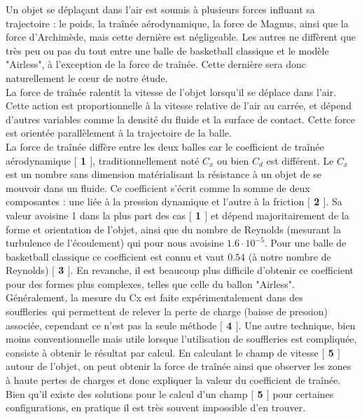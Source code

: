 \documentclass{article}
\newcommand{\mvtab} {\vspace{0.1cm}}
\newcommand{\htab} {\hspace{1cm}}
\begin{document}
\htab Un objet se déplaçant dans l'air est soumis à plusieurs forces influant sa trajectoire : le poids, la traînée aérodynamique, la force de Magnus, ainsi que la force d'Archimède, mais cette dernière est négligeable. Les autres ne diffèrent que très peu ou pas du tout entre une balle de basketball classique et le modèle "Airless", à l'exception de la force de traînée. Cette dernière sera donc naturellement le cœur de notre étude. \\ \mvtab
\htab La force de traînée ralentit la vitesse de l'objet lorsqu'il se déplace dans l'air. Cette action est proportionnelle à la vitesse relative de l'air au carrée, et dépend d'autres variables comme la densité du fluide et la surface de contact. Cette force est orientée parallèlement à la trajectoire de la balle. \\  \mvtab
\htab La force de traînée diffère entre les deux balles car le coefficient de traînée aérodynamique \textbf{$[$ 1 $]$}, traditionnellement noté $C_x$ ou bien $C_d$ est différent. Le $C_x$ est un nombre sans dimension matérialisant la résistance à un objet de se mouvoir dans un fluide. Ce coefficient s'écrit comme la somme de deux composantes : une liée à la pression dynamique et l'autre à la friction \textbf{$[$ 2 $]$}. Sa valeur avoisine 1 dans la plus part des cas \textbf{$[$ 1 $]$} et dépend majoritairement de la forme et orientation de l'objet, ainsi que du nombre de Reynolds (mesurant la turbulence de l’écoulement) qui pour nous avoisine $1.6 \cdot 10^{-5}$. Pour une balle de basketball classique ce coefficient est connu et vaut $0.54$ (à notre nombre de Reynolds) \textbf{$[$ 3 $]$}. En revanche, il est beaucoup plus difficile d’obtenir ce coefficient pour des formes plus complexes, telles que celle du ballon "Airless". \\ \mvtab
\htab Généralement, la mesure du Cx est faite expérimentalement dans des souffleries qui permettent de relever la perte de charge (baisse de pression) associée, cependant ce n’est pas la seule méthode \textbf{$[$ 4 $]$}. Une autre technique, bien moins conventionnelle mais utile lorsque l'utilisation de souffleries est compliquée, consiste à obtenir le résultat par calcul. En calculant le champ de vitesse \textbf{$[$ 5 $]$} autour de l’objet, on peut obtenir la force de traînée ainsi que observer les zones à haute pertes de charges et donc expliquer la valeur du coefficient de traînée. Bien qu'il existe des solutions pour le calcul d'un champ \textbf{$[$ 5 $]$} pour certaines configurations, en pratique il est très souvent impossible d'en trouver. \\ \mvtab
\end{document}
